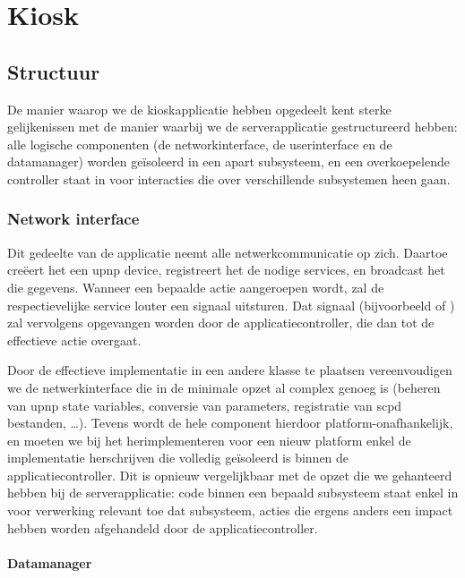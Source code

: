 \part{Kiosk}
\label{kiosk}


\chapter{Structuur}

De manier waarop we de kioskapplicatie hebben opgedeelt kent sterke gelijkenissen met de manier waarbij we de serverapplicatie gestructureerd hebben: alle logische componenten (de networkinterface, de userinterface en de datamanager) worden geïsoleerd in een apart subsysteem, en een overkoepelende controller staat in voor interacties die over verschillende subsystemen heen gaan.

\section{Network interface}

Dit gedeelte van de applicatie neemt alle netwerkcommunicatie op zich. Daartoe creëert het een \ac{upnp} device, registreert het de nodige services, en broadcast het die gegevens. Wanneer een bepaalde actie aangeroepen wordt, zal de respectievelijke service louter een signaal uitsturen. Dat signaal (bijvoorbeeld  of ) zal vervolgens opgevangen worden door de applicatiecontroller, die dan tot de effectieve actie overgaat.

Door de effectieve implementatie in een andere klasse te plaatsen vereenvoudigen we de netwerkinterface die in de minimale opzet al complex genoeg is (beheren van \ac{upnp} state variables, conversie van parameters, registratie van \ac{scpd} bestanden, \ldots). Tevens wordt de hele component hierdoor platform-onafhankelijk, en moeten we bij het herimplementeren voor een nieuw platform enkel de implementatie herschrijven die volledig geïsoleerd is binnen de applicatiecontroller. Dit is opnieuw vergelijkbaar met de opzet die we gehanteerd hebben bij de serverapplicatie: code binnen een bepaald subsysteem staat enkel in voor verwerking relevant toe dat subsysteem, acties die ergens anders een impact hebben worden afgehandeld door de applicatiecontroller.

\subsection{Datamanager}

